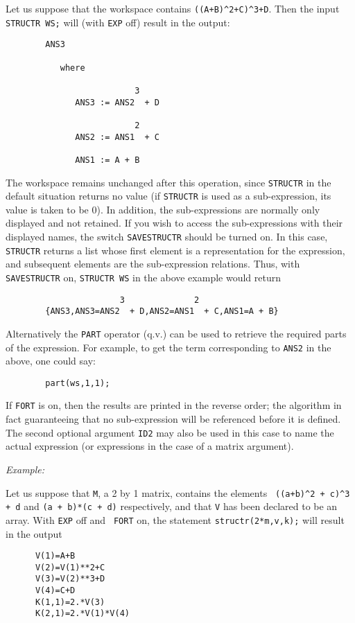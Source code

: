 Let us suppose that the workspace contains {\tt ((A+B)\^{ }2+C)\^{ }3+D}.
Then the input {\tt STRUCTR WS;} will (with {\tt EXP} off) result in the
output:
\begin{verbatim}
        ANS3

           where

                          3
              ANS3 := ANS2  + D

                          2
              ANS2 := ANS1  + C

              ANS1 := A + B
\end{verbatim}
The workspace remains unchanged after this operation, since {\tt STRUCTR}
 in the default situation returns
no value (if {\tt STRUCTR} is used as a sub-expression, its value is taken
to be 0).  In addition, the sub-expressions are normally only displayed
and not retained. If you wish to access the sub-expressions with their
displayed names, the switch {\tt SAVESTRUCTR}  should be
turned on.  In this case, {\tt STRUCTR} returns a list whose first element
is a representation for the expression, and subsequent elements are the
sub-expression relations.  Thus, with {\tt SAVESTRUCTR} on, {\tt STRUCTR WS}
in the above example would return
\begin{verbatim}
                       3              2
        {ANS3,ANS3=ANS2  + D,ANS2=ANS1  + C,ANS1=A + B}
\end{verbatim}
Alternatively the {\tt PART}  operator (q.v.) can
be used to retrieve the required parts of the expression.  For example, to
get the term corresponding to {\tt ANS2} in the above, one could say:
\begin{verbatim}
        part(ws,1,1);
\end{verbatim}
If {\tt FORT} is on, then the results are printed in the reverse order; the
algorithm in fact guaranteeing that no sub-expression will be referenced
before it is defined.  The second optional argument {\tt ID2} may also be
used in this case to name the actual expression (or expressions in the
case of a matrix argument).

{\it Example:}

Let us suppose that {\tt M}, a 2 by 1 matrix, contains the elements {\tt
((a+b)\^{ }2 + c)\^{ }3 + d} and {\tt (a + b)*(c + d)} respectively, and that
{\tt V} has been declared to be an array.  With {\tt EXP} off and {\tt
FORT} on, the statement {\tt structr(2*m,v,k);} will result in the output

\begin{verbatim}
      V(1)=A+B
      V(2)=V(1)**2+C
      V(3)=V(2)**3+D
      V(4)=C+D
      K(1,1)=2.*V(3)
      K(2,1)=2.*V(1)*V(4)
\end{verbatim}

